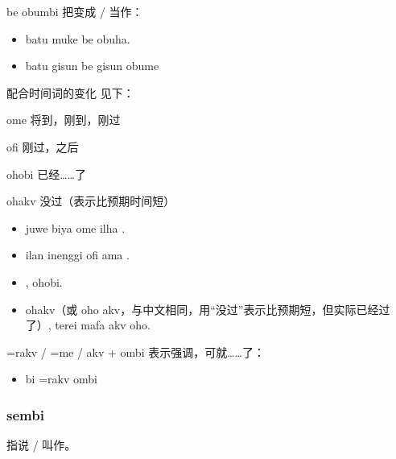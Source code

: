 \begin{des}
\begin{itemize}
        \end{itemize}
    \item[\A \B be \C obumbi] \A 把\B 变成 / 当作\C ：
        \begin{itemize}
            \item batu muke be  obuha.
            \item batu  gisun be  gisun obume 
        \end{itemize}
    \item[配合时间词的变化]见下：
        \begin{des}
            \item[ome] 将到，刚到，刚过
            \item[ofi] 刚过，之后
            \item[ohobi] 已经……了
            \item[ohakv] 没过（表示比预期时间短） 
        \end{des}
        \begin{itemize}
            \item juwe biya ome  ilha .
            \item ilan inenggi ofi ama .
            \item {},  ohobi.
            \item {} ohakv（或 oho akv，与中文相同，用“没过”表示比预期短，但实际已经过了）, terei mafa akv oho.
        \end{itemize}
    \item[\V=rakv / \V=me / akv + ombi] 表示强调，可就……了：
        \begin{itemize}
            \item bi  \!=rakv ombi
        \end{itemize}
\end{des}

\subsubsection{sembi}

指说 / 叫作。

